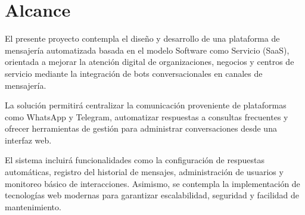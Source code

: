 \section{Alcance}
El presente proyecto contempla el diseño y desarrollo de una plataforma de mensajería automatizada basada en el modelo Software como Servicio (SaaS), orientada a mejorar la atención digital de organizaciones, negocios y centros de servicio mediante la integración de bots conversacionales en canales de mensajería.

La solución permitirá centralizar la comunicación proveniente de plataformas como WhatsApp y Telegram, automatizar respuestas a consultas frecuentes y ofrecer herramientas de gestión para administrar conversaciones desde una interfaz web.

El sistema incluirá funcionalidades como la configuración de respuestas automáticas, registro del historial de mensajes, administración de usuarios y monitoreo básico de interacciones. Asimismo, se contempla la implementación de tecnologías web modernas para garantizar escalabilidad, seguridad y facilidad de mantenimiento.